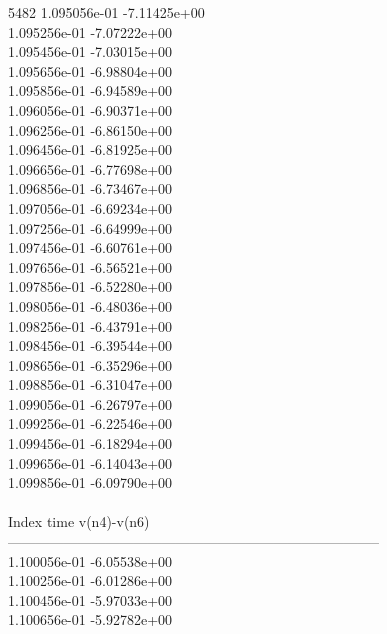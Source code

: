 5482	1.095056e-01	-7.11425e+00	\\ 	1.095256e-01	-7.07222e+00	\\ 	1.095456e-01	-7.03015e+00	\\ 	1.095656e-01	-6.98804e+00	\\ 	1.095856e-01	-6.94589e+00	\\ 	1.096056e-01	-6.90371e+00	\\ 	1.096256e-01	-6.86150e+00	\\ 	1.096456e-01	-6.81925e+00	\\ 	1.096656e-01	-6.77698e+00	\\ 	1.096856e-01	-6.73467e+00	\\ 	1.097056e-01	-6.69234e+00	\\ 	1.097256e-01	-6.64999e+00	\\ 	1.097456e-01	-6.60761e+00	\\ 	1.097656e-01	-6.56521e+00	\\ 	1.097856e-01	-6.52280e+00	\\ 	1.098056e-01	-6.48036e+00	\\ 	1.098256e-01	-6.43791e+00	\\ 	1.098456e-01	-6.39544e+00	\\ 	1.098656e-01	-6.35296e+00	\\ 	1.098856e-01	-6.31047e+00	\\ 	1.099056e-01	-6.26797e+00	\\ 	1.099256e-01	-6.22546e+00	\\ 	1.099456e-01	-6.18294e+00	\\ 	1.099656e-01	-6.14043e+00	\\ 	1.099856e-01	-6.09790e+00	\\ \hline
\\ \hline
Index   time            v(n4)-v(n6)     \\ \hline
--------------------------------------------------------------------------------\\ 	1.100056e-01	-6.05538e+00	\\ 	1.100256e-01	-6.01286e+00	\\ 	1.100456e-01	-5.97033e+00	\\ 	1.100656e-01	-5.92782e+00	\\ \hline
